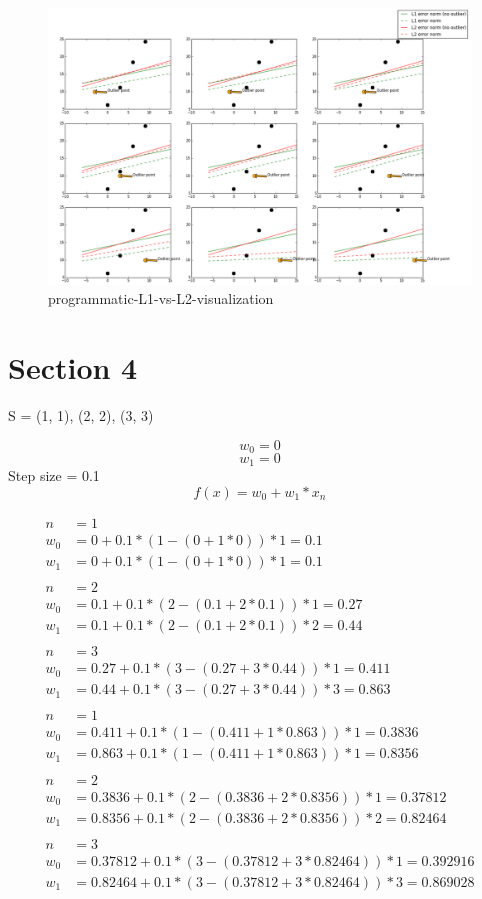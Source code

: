 \documentclass{report}
\begin{document}
\begin{figure}[h!]
\includegraphics[width=\linewidth]{programmatic-L1-vs-L2-visualization.png}
\caption{programmatic-L1-vs-L2-visualization}
\label{fig:programmatic-L1-vs-L2-visualization}
\end{figure}

\chapter{Section 4}
S = {(1, 1), (2, 2), (3, 3)}

$$w_0 = 0$$
$$w_1 = 0$$
Step size = 0.1
$$f(x) = w_0+w_1*x_n$$

\begin{equation} \label{eq1}
\begin{split}
n & = 1\\
w_0 & = 0 + 0.1 * (1-(0+1*0)) * 1 = 0.1\\
w_1 & = 0 + 0.1 * (1-(0+1*0)) * 1 = 0.1\\
\\
n & = 2\\
w_0 & = 0.1 + 0.1 * (2-(0.1+2*0.1)) * 1 = 0.27\\
w_1 & = 0.1 + 0.1 * (2-(0.1+2*0.1)) * 2 = 0.44\\
\\
n & = 3\\
w_0 & = 0.27 + 0.1 * (3-(0.27+3*0.44)) * 1 = 0.411\\
w_1 & = 0.44 + 0.1 * (3-(0.27+3*0.44)) * 3 = 0.863\\
\\
n & = 1\\
w_0 & = 0.411 + 0.1 * (1-(0.411+1*0.863)) * 1 = 0.3836\\
w_1 & = 0.863 + 0.1 * (1-(0.411+1*0.863)) * 1 = 0.8356\\
\\
n & = 2\\
w_0 & = 0.3836 + 0.1 * (2-(0.3836+2*0.8356)) * 1 = 0.37812\\
w_1 & = 0.8356 + 0.1 * (2-(0.3836+2*0.8356)) * 2 = 0.82464\\
\\
n & = 3\\
w_0 & = 0.37812 + 0.1 * (3-(0.37812+3*0.82464)) * 1 = 0.392916\\
w_1 & = 0.82464 + 0.1 * (3-(0.37812+3*0.82464)) * 3 = 0.869028\\
\end{split}
\end{equation}
\end{document}
